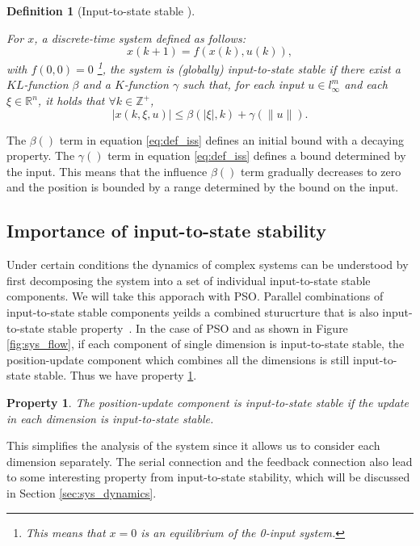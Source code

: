 \documentclass{sig-alternate}
\newtheorem{mydef}{Definition}
\newtheorem{myprop}{Property}
\begin{document}
\begin{mydef}[Input-to-state stable \cite{Jiang2001857}]
\label{def:iss}

For $ x $, a discrete-time system defined as follows:
\begin{equation}
\label{eq:dis_nonlinear}
x(k+1) = f( x(k) , u(k) ),
\end{equation}
with $ f(0,0) = 0 $
\footnote{This means that $ x = 0 $ is an equilibrium of the 0-input system.}, the system is \emph{(globally) input-to-state stable} if there exist a $ KL $-function $ \beta  $ and a $ K $-function $ \gamma $ such that, for each input $ u \in l^{m}_{\infty} $ and each $ \xi \in \mathbb{R}^{n} $, it holds that $  \forall k \in \mathbb{Z}^{+} $,
\begin{equation}
\label{eq:def_iss}
| x(k, \xi, u) | \leq \beta (| \xi |, k) + \gamma (\lVert u \rVert).
\end{equation}
\end{mydef}

The $ \beta () $ term in equation \eqref{eq:def_iss} defines an initial bound with a decaying property.
The $ \gamma () $ term in equation \eqref{eq:def_iss} defines a bound determined by the input.
This means that the influence $ \beta () $ term gradually decreases to zero and the position is bounded by a range determined by the bound on the input.

\subsection{Importance of input-to-state stability}
\label{sec:connect_iss_to_pso}

Under certain conditions the dynamics of complex systems can be understood by first decomposing the system into a set of individual input-to-state stable components. We will take this apporach with PSO. 
Parallel combinations of input-to-state stable components yeilds a combined sturucrture that is also input-to-state stable property~\cite{khalil1996nonlinear}.
In the case of PSO and as shown in Figure \ref{fig:sys_flow}, if each component of single dimension is input-to-state stable, the position-update component which combines all the dimensions is still input-to-state stable.
Thus we have property \ref{prop:iss:parallel}.
\begin{myprop}
\label{prop:iss:parallel}
The position-update component is input-to-state stable if the update in each dimension is input-to-state stable.
\end{myprop}
This simplifies the analysis of the system since it allows us to consider each dimension separately.
The serial connection and the feedback connection also lead to some interesting property from input-to-state stability, which will be discussed in Section \ref{sec:sys_dynamics}.
\end{document}
